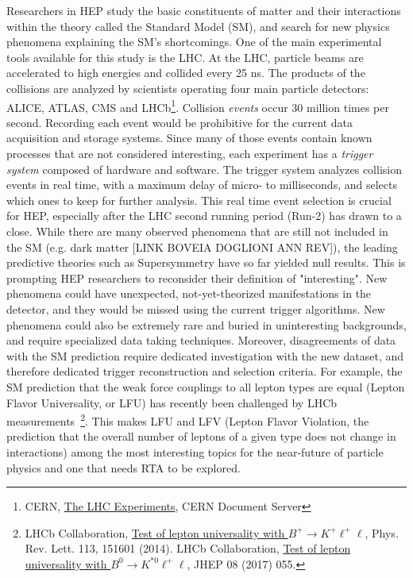 Researchers in HEP study the basic constituents of matter and their interactions within the theory called the Standard Model (SM), and search for new physics phenomena explaining the SM's shortcomings. 
One of the main experimental tools available for this study is the LHC. 
At the LHC, particle beams are accelerated to high energies and collided every 25 ns. 
The products of the collisions are analyzed by scientists operating four main particle detectors: ALICE, ATLAS, CMS and LHCb\footnote{CERN, \href{http://cds.cern.ch/record/1997374}{The LHC Experiments}, CERN Document Server}.
Collision \textit{events} occur 30 million times per second. 
Recording each event would be prohibitive for the current data acquisition and storage systems. 
Since many of those events contain known processes that are not considered interesting, each experiment has a \textit{trigger system} composed of hardware and software.
The trigger system analyzes collision events in real time, with a maximum delay of micro- to milliseconds, and selects which ones to keep for further analysis. 
This real time event selection is crucial for HEP, especially after the LHC second running period (Run-2) has drawn to a close. 
While there are many observed phenomena that are still not included in the SM (e.g. dark matter [LINK BOVEIA DOGLIONI ANN REV]), the leading predictive theories such as Supersymmetry have so far yielded null results. 
This is prompting HEP researchers to reconsider their definition of "interesting". 
New phenomena could have unexpected, not-yet-theorized manifestations in the detector, and they would be missed using the current trigger algorithms. 
New phenomena could also be extremely rare and buried in uninteresting backgrounds, and require specialized data taking techniques. 
Moreover, disagreements of data with the SM prediction require dedicated investigation with the new dataset, and therefore dedicated trigger reconstruction and selection criteria. 
For example, the SM prediction that the weak force couplings to all lepton types are equal (Lepton Flavor Universality, or LFU) has recently been challenged by LHCb measurements~\footnote{LHCb Collaboration, \href{https://arxiv.org/abs/1705.05802}{Test of lepton universality with $ B^{+}\rightarrow K^{+}\ell^{+}\ell$}, Phys. Rev. Lett. 113, 151601 (2014). LHCb Collaboration, \href{https://arxiv.org/abs/1705.05802}{Test of lepton universality with $B^{0}\rightarrow K^{* 0}\ell^{+}\ell$}, JHEP 08 (2017) 055.}. This makes LFU and LFV (Lepton Flavor Violation, the prediction that the overall number of leptons of a given type does not change in interactions) among the most interesting topics for the near-future of particle physics and one that needs RTA to be explored. 

